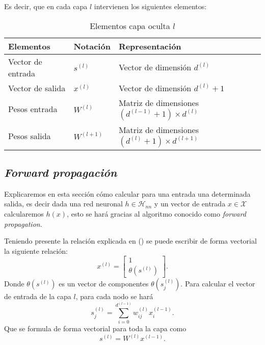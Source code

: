 Es decir, que en cada capa $l$ intervienen los siguientes elementos:  
\begin{table}[h]
    \begin{center}
    \begin{tabular}{| l | l | l |}
    \hline
    Elementos & Notación & Representación 
    \\ \hline
    Vector de entrada & $s^{(l)}$ &  Vector de dimensión $d^{(l)}$ \\
    Vector de salida & $x^{(l)}$ &  Vector de dimensión $d^{(l)}+ 1$ \\
    Pesos entrada & $W^{(l)}$ & Matriz de dimensiones $(d^{(l-1)}+1) \times d^{(l)}$ \\
    Pesos salida & $W^{(l+1)}$ 
    & Matriz de dimensiones $(d^{(l)}+1) \times d^{(l+1)}$ \\
    \hline
    \end{tabular}
    \caption{Elementos capa oculta $l$}
    \label{tab:rrnn_elementos_capa_oculta}
    \end{center}
\end{table}

\subsection{ \textit{Forward propagación}}

Explicaremos en esta sección cómo calcular para una entrada una determinada salida, es decir
dada una red neuronal $h \in \mathcal{H}_{n n}$ y un vector de entrada $x \in \mathcal{X}$ calcularemos  $h(x)$, esto se hará gracias al algoritmo conocido como \textit{forward propagation}.

Teniendo presente la relación  explicada en () se puede escribir de forma vectorial la siguiente relación: 
\begin{equation}
    x^{(l)} = 
    \left[ \begin{array}{c}
        1 \\
       \theta(s^{(l)})
        \end{array}
\right] .
\end{equation}
Donde $\theta(s^{(l)})$ es un vector de componentes $\theta(s^{(l)}_j)$. 
Para calcular el vector de entrada de la capa $l$, para cada nodo se hará
\begin{equation}
    s_j^{(l)} = \sum_{i=0}^{d^{(l-1)}} w_{i j}^{(l)}x_i^{(l-1)}.
\end{equation}
Que se formula de forma vectorial para toda la capa como 
\begin{equation}
    s^{(l)} = W^{(l)} x^{(l-1)}.
\end{equation}

